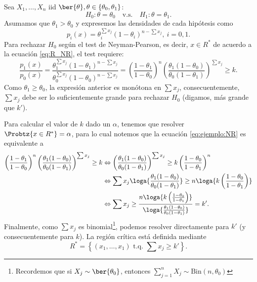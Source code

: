 \begin{example}
	Sea $X_1,\ldots, X_n$ iid $\ber{\theta}, \theta\in\{\theta_0,\theta_1\}$: 
	\begin{equation}
		H_0:\theta =\theta_0\quad \text{v.s.}\quad H_1:\theta = \theta_1.
	\end{equation} 
	Asumamos que $\theta_1>\theta_0$ y expresemos las densidades de cada hipótesis como 
	\begin{equation}
		p_i(x) = \theta_i^{\sum x_j}(1-\theta_i)^{n-\sum x_j},\ i=0,1.
	\end{equation}
	Para rechazar $H_0$ según el test de Neyman-Pearson, es decir, $x\in R^*$ de acuerdo a la ecuación \eqref{eq:R_NR}, el test requiere: 
	\begin{equation}
		\label{eq:ejemplo:NR}
		\frac{p_1(x)}{p_0(x)} = \frac{\theta_1^{\sum x_j}(1-\theta_1)^{n-\sum x_j}}{\theta_0^{\sum x_j}(1-\theta_0)^{n-\sum x_j}} = \left(\frac{1-\theta_1}{1-\theta_0}\right)^n\left(\frac{\theta_1(1-\theta_0)}{\theta_0(1-\theta_1)}\right)^{\sum x_j}\geq k. 
	\end{equation}
	Como $\theta_1\geq\theta_0$, la expresión anterior es monótona en  $\sum x_j$, consecuentemente, $\sum x_j$ debe ser lo suficientemente grande para rechazar $H_0$ (digamos, más grande que $k'$). 
	
	Para calcular el valor de $k$ dado un $\alpha$, tenemos que resolver $\Probtz{x\in R^*} = \alpha$, para lo cual notemos que la ecuación \eqref{eq:ejemplo:NR} es equivalente a 
	\begin{align}
	 	\left(\frac{1-\theta_1}{1-\theta_0}\right)^n\left(\frac{\theta_1(1-\theta_0)}{\theta_0(1-\theta_1)}\right)^{\sum x_j}\geq k 
	 	& \Leftrightarrow 
	 	\left(\frac{\theta_1(1-\theta_0)}{\theta_0(1-\theta_1)}\right)^{\sum x_j}\geq k \left(\frac{1-\theta_0}{1-\theta_1}\right)^n\\
	 	& \Leftrightarrow 
	 	\sum x_j \loga{\frac{\theta_1(1-\theta_0)}{\theta_0(1-\theta_1)}}\geq n \loga{k \left(\frac{1-\theta_0}{1-\theta_1}\right)} \nonumber\\
	 	& \Leftrightarrow 
	 	\sum x_j \geq \frac{n \loga{k \left(\frac{1-\theta_0}{1-\theta_1}\right)}}{\loga{\frac{\theta_1(1-\theta_0)}{\theta_0(1-\theta_1)}}} = k'. \nonumber
	 \end{align} 
	 Finalmente, como $\sum x_j$ es binomial\footnote{Recordemos que si $X_j\sim\ber{\theta_0}$, entonces  $\sum_{j=1}^n X_j\sim\text{Bin}(n,\theta_0)$}, podemos resolver directamente para $k'$ (y consecuentemente para $k$). La región crítica  está definida mediante 
	 \begin{equation}
	     R^* = \left\{(x_1,\ldots,x_1) \text{ t.q. } \sum x_j\geq k'\right\}.
	 \end{equation}
\end{example}

